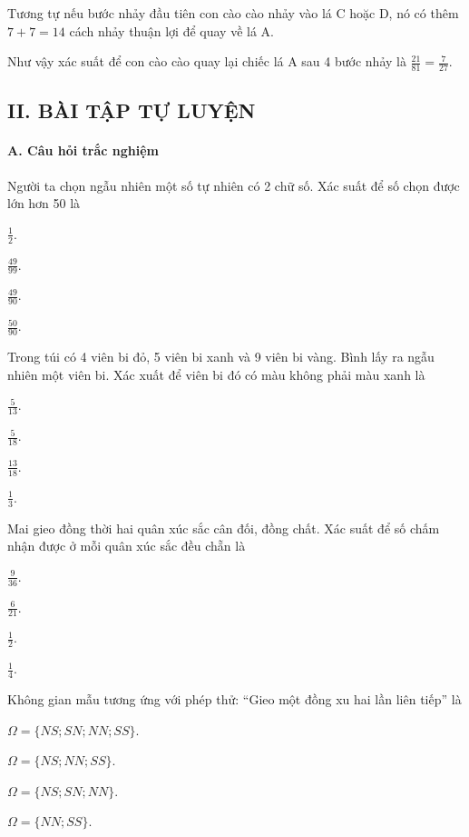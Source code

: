 \documentclass[%
    fontsize=12pt,%
    chapterprefix=false,%
    open=right,%
    twoside=false,%
    numbers=noenddot,%
    headings=optiontohead,%
    final,%
    DIV=15,%
    parskip=half %
]{scrbook}
\begin{document}
Tương tự nếu bước nhảy đầu tiên con cào cào nhảy vào lá C hoặc D, nó có thêm $7 + 7 = 14$ cách nhảy thuận lợi để quay về lá A.

Như vậy xác suất để con cào cào quay lại chiếc lá A sau 4 bước nhảy là $\frac{21}{81} = \frac{7}{27}$.
\subsection{II. BÀI TẬP TỰ LUYỆN}
\paragraph{A. Câu hỏi trắc nghiệm}

\begin{tracnghiem}

\item Người ta chọn ngẫu nhiên một số tự nhiên có 2 chữ số. Xác suất để số chọn được lớn hơn 50 là
\begin{options}
  \item $\frac{1}{2}$.
  \item $\frac{49}{99}$.
  \item $\frac{49}{90}$.
  \item $\frac{50}{90}$.
\end{options}

\item Trong túi có 4 viên bi đỏ, 5 viên bi xanh và 9 viên bi vàng. Bình lấy ra ngẫu nhiên một viên bi. Xác xuất để viên bi đó có màu không phải màu xanh là
\begin{options}
  \item $\frac{5}{13}$.
  \item $\frac{5}{18}$.
  \item $\frac{13}{18}$.
  \item $\frac{1}{3}$.
\end{options}

\item Mai gieo đồng thời hai quân xúc sắc cân đối, đồng chất. Xác suất để số chấm nhận được ở mỗi quân xúc sắc đều chẵn là
\begin{options}
  \item $\frac{9}{36}$.
  \item $\frac{6}{21}$.
  \item $\frac{1}{2}$.
  \item $\frac{1}{4}$.
\end{options}

\item Không gian mẫu tương ứng với phép thử: ``Gieo một đồng xu hai lần liên tiếp'' là
\begin{options}
  \item $\Omega = \{NS; SN; NN; SS\}$.
  \item $\Omega = \{NS; NN; SS\}$.
  \item $\Omega = \{NS; SN; NN\}$.
  \item $\Omega = \{NN; SS\}$.
\end{options}


\end{tracnghiem}
\end{document}
